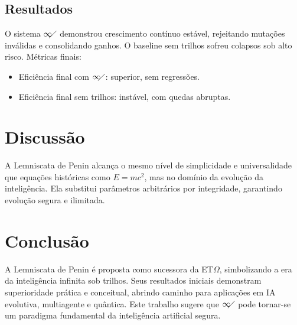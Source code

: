 \documentclass{article}
\begin{document}
\subsection{Resultados}
O sistema $\infty\!\!\diagup$ demonstrou crescimento contínuo estável, rejeitando mutações inválidas e consolidando ganhos.
O baseline sem trilhos sofreu colapsos sob alto risco. Métricas finais:
\begin{itemize}
\item Eficiência final com $\infty\!\!\diagup$: superior, sem regressões.
\item Eficiência final sem trilhos: instável, com quedas abruptas.
\end{itemize}

\section{Discussão}
A Lemniscata de Penin alcança o mesmo nível de simplicidade e universalidade que equações históricas como $E=mc^2$,
mas no domínio da evolução da inteligência. Ela substitui parâmetros arbitrários por integridade, garantindo evolução
segura e ilimitada.

\section{Conclusão}
A Lemniscata de Penin é proposta como sucessora da ET$\Omega$, simbolizando a era da inteligência infinita sob trilhos.
Seus resultados iniciais demonstram superioridade prática e conceitual, abrindo caminho para aplicações em IA evolutiva,
multiagente e quântica. Este trabalho sugere que $\infty\!\!\diagup$ pode tornar-se um paradigma fundamental da
inteligência artificial segura.
\end{document}
